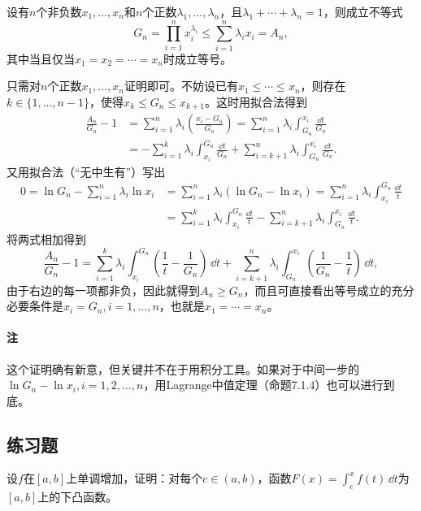 \begin{xexample}[11.2.6]
设有$n$个非负数$x_1,\ldots,x_n$和$n$个正数$\lambda_1,\ldots,\lambda_n$，且$\lambda_1+\cdots+\lambda_n=1$，则成立不等式
\begin{equation}
  G_n=\prod_{i=1}^nx_i^{\lambda_i}\le\sum_{i=1}^n\lambda_ix_i=A_n,
  \tag{11.16}
  \label{eq:11.16}
\end{equation}
其中当且仅当$x_1=x_2=\cdots=x_n$时成立等号。
\end{xexample}
\begin{xproof}
只需对$n$个正数$x_1,\ldots,x_n$证明即可。不妨设已有$x_1\le\cdots\le x_n$，则存在$k\in\{1,\ldots,n-1\}$，使得$x_k\le G_n\le x_{k+1}$。这时用拟合法得到
\begin{align*}
\frac{A_n}{G_n}-1
&=\sum_{i=1}^n\lambda_i\left(\frac{x_i-G_n}{G_n}\right)
 =\sum_{i=1}^n\lambda_i\int_{G_n}^{x_i}\frac{\dd t}{G_n}\\
&=-\sum_{i=1}^k\lambda_i\int_{x_i}^{G_n}\frac{\dd t}{G_n}
 +\sum_{i=k+1}^n\lambda_i\int_{G_n}^{x_i}\frac{\dd t}{G_n}.
\end{align*}
又用拟合法（“无中生有”）写出
\begin{align*}
0=\ln G_n-\sum_{i=1}^n\lambda_i\ln x_i
&=\sum_{i=1}^n\lambda_i(\ln G_n-\ln x_i)
 =\sum_{i=1}^n\lambda_i\int_{x_i}^{G_n}\frac{\dd t}{t}\\
&=\sum_{i=1}^k\lambda_i\int_{x_i}^{G_n}\frac{\dd t}{t}
 -\sum_{i=k+1}^n\lambda_i\int_{G_n}^{x_i}\frac{\dd t}{t}.
\end{align*}
将两式相加得到
\[
  \frac{A_n}{G_n}-1
  =\sum_{i=1}^k\lambda_i\int_{x_i}^{G_n}\left(\frac1t-\frac1{G_n}\right)\,\dd t
  +\sum_{i=k+1}^n\lambda_i\int_{G_n}^{x_i}\left(\frac1{G_n}-\frac1t\right)\,\dd t,
\]
由于右边的每一项都非负，因此就得到$A_n\ge G_n$，而且可直接看出等号成立的充分必要条件是$x_i=G_n,i=1,\ldots,n$，也就是$x_1=\cdots=x_n$。
\end{xproof}

\paragraph{注} 这个证明确有新意，但关键并不在于用积分工具。如果对于中间一步的$\ln G_n-\ln x_i,i=1,2,\ldots,n$，用Lagrange中值定理（命题7.1.4）也可以进行到底。

\subsection{练习题}

\begin{xexercise}[1]
设$f$在$[a,b]$上单调增加，证明：对每个$c\in(a,b)$，函数$F(x)=\int_c^xf(t)\,\dd t$为$[a,b]$上的下凸函数。
\end{xexercise}

